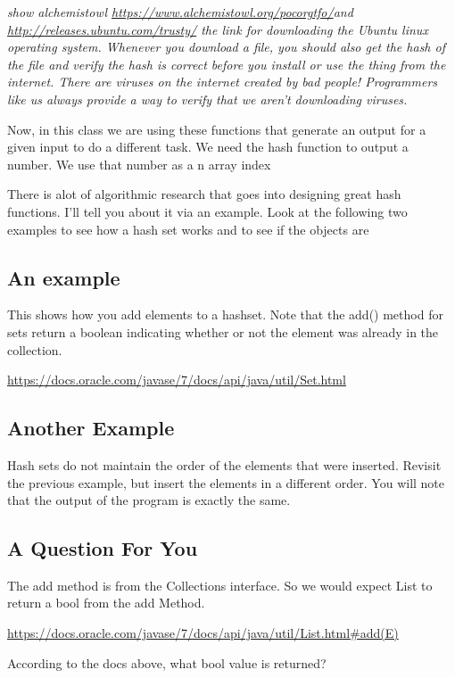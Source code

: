 \documentclass[12pt]{article}
\begin{document}
{\LARGE\textit{show alchemistowl \url{https://www.alchemistowl.org/pocorgtfo/}and \url{http://releases.ubuntu.com/trusty/} the link for downloading the Ubuntu linux operating system. Whenever you download a file, you should also get the hash of the file and verify the hash is correct before you install or use the thing from the internet. There are viruses on the internet created by bad people! Programmers like us always provide a way to verify that we aren't downloading viruses.}}

Now, in this class we are using these functions that generate an output for a given input to do a different task. We need the hash function to output a number. We use that number as a n array index

There is alot of algorithmic research that goes into designing great hash functions. I'll tell you about it via an example.  Look at the following two examples to see how a hash set works and to see if the objects are 

\subsection{An example}
This shows how you add elements to a hashset. Note that the add() method for sets return a boolean indicating whether or not the element was already in the collection.

\url{https://docs.oracle.com/javase/7/docs/api/java/util/Set.html}



\subsection{Another Example}
Hash sets do not maintain the order of the elements that were inserted. Revisit the previous example, but insert the elements in a different order. You will note that the output of the program is exactly the same.


\subsection{A Question For You}
The add method is from the Collections interface. So we would expect List to return a bool from the add Method.

\url{https://docs.oracle.com/javase/7/docs/api/java/util/List.html#add(E)}

According to the docs above, what bool value is returned?
\end{document}
